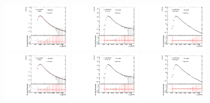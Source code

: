 \begin{figure}[htbp!]
\begin{center}
\includegraphics[width=0.31\textwidth,angle=-90]{figures/boosted/Syst_CRSB/SB_Small_compare_FourTag_qcd_hh.pdf}
\includegraphics[width=0.31\textwidth,angle=-90]{figures/boosted/Syst_CRSB/SB_Small_compare_ThreeTag_qcd_hh.pdf}
\includegraphics[width=0.31\textwidth,angle=-90]{figures/boosted/Syst_CRSB/SB_Small_compare_TwoTag_split_qcd_hh.pdf}
\includegraphics[width=0.31\textwidth,angle=-90]{figures/boosted/Syst_CRSB/SB_Large_compare_FourTag_qcd_hh.pdf}
\includegraphics[width=0.31\textwidth,angle=-90]{figures/boosted/Syst_CRSB/SB_Large_compare_ThreeTag_qcd_hh.pdf}
\includegraphics[width=0.31\textwidth,angle=-90]{figures/boosted/Syst_CRSB/SB_Large_compare_TwoTag_split_qcd_hh.pdf}

\end{center}
\end{figure}
